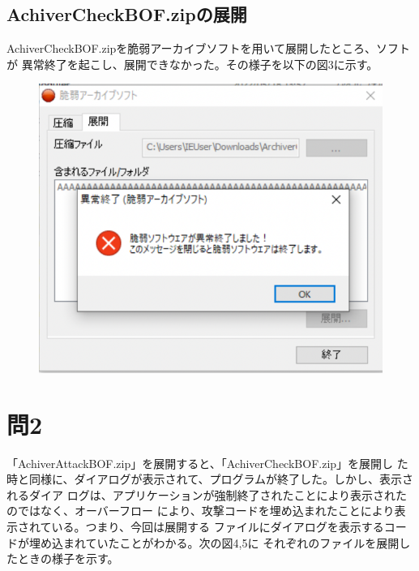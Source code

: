 \documentclass[dvipdfmx,autodetect-engine,titlepage]{jsarticle}
\begin{document}
\begin{figure}[h]
\begin{minipage}[b]{0.45\linewidth}
\begin{center}
    \end{center}
    \caption{}
  \end{minipage}
\end{figure}

\subsection{AchiverCheckBOF.zipの展開}

AchiverCheckBOF.zipを脆弱アーカイブソフトを用いて展開したところ、ソフトが
異常終了を起こし、展開できなかった。その様子を以下の図3に示す。

\begin{figure}[h]
  \centering
  \includegraphics[scale=0.8]{pic2.png}
  \caption{}
\end{figure}

\section{問2}

「AchiverAttackBOF.zip」を展開すると、「AchiverCheckBOF.zip」を展開し
た時と同様に、ダイアログが表示されて、プログラムが終了した。しかし、表示されるダイア
ログは、アプリケーションが強制終了されたことにより表示されたのではなく、オーバーフロー
により、攻撃コードを埋め込まれたことにより表示されている。つまり、今回は展開する
ファイルにダイアログを表示するコードが埋め込まれていたことがわかる。次の図4,5に
それぞれのファイルを展開したときの様子を示す。
\end{document}
